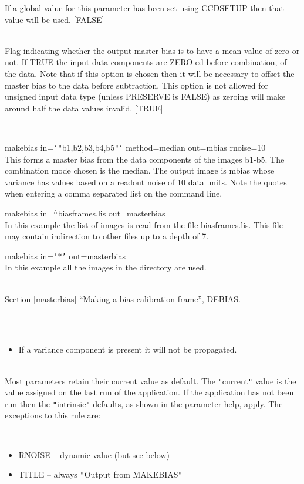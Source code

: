 \documentclass[twoside,11pt]{article}
\newcommand{\htmlref}[2]{#1}
\newcommand{\latexhtml}[2]{#1}
\renewcommand{\_}{\texttt{\symbol{95}}}
\newcommand{\qt}[1]{{\tt "}#1{\tt "}}
\newcommand{\qs}[1]{{\tt '}#1{\tt '}}
\newcommand{\xroutine}[1]{\htmlref{{\sc #1}}{#1}}
\newcommand{\secref}[2]{\latexhtml{Section \ref{#1} ``#2''}{``\htmlref{#2}{#1}''}}
\newcommand{\sstexamples}[1]{
   \item[Examples:] \mbox{} \\
   \vspace{-3.5ex}
   \begin{description}
      #1
   \end{description}
}
\newcommand{\sstsubsection}[1]{ \item[{#1}] \mbox{} \\}
\newcommand{\sstexamplesubsection}[2]{\sloppy \item{\ssttt #1} \mbox{} \\ #2 }
\newcommand{\sstnotes}[1]{\item[Notes:] \mbox{} \\[1.3ex] #1}
\newcommand{\sstdiytopic}[2]{\item[#1:] \mbox{} \\[1.3ex] #2}
\newcommand{\sstitemlist}[1]{
  \mbox{} \\
  \vspace{-3.5ex}
  \begin{itemize}
     #1
  \end{itemize}
}
\newcommand{\sstitem}{\item}
\newcommand{\sstexamples}[1]{
      \item[Examples:] \\
      \begin{description}
         #1
      \end{description}
      \\
   }
\newcommand{\sstsubsection}[1]{\item[{#1}]}
\newcommand{\sstexamplesubsection}[2]{\item[{\ssttt #1}] #2}
\newcommand{\sstnotes}[1]{\item[Notes:] #1 }
\newcommand{\sstdiytopic}[2]{\item[{#1:}] #2 }
\newcommand{\sstitemlist}[1]{
      \begin{itemize}
         #1
      \end{itemize}
      \\
   }
\newcommand{\sstitem}{\item}
\begin{document}
{{{         If a global value for this parameter has been set using 
         CCDSETUP then that value will be used. 
         [FALSE]
      }
      \sstsubsection{
         ZERO = \_LOGICAL (Read)
      } {
         Flag indicating whether the output master bias is to have a
         mean value of zero or not. If TRUE the input data components
         are ZERO-ed before combination, of the data. Note that if
         this option is chosen then it will be necessary to offset the
         master bias to the data before subtraction. This option is
         not allowed for unsigned input data type (unless PRESERVE is
         FALSE) as zeroing will make around half the data values
         invalid.
         [TRUE]
      }
   }
   \sstexamples{
      \sstexamplesubsection{
         makebias in=\qs{\qt{b1,b2,b3,b4,b5}} method=median out=mbias rnoise=10
      } {
         This forms a master bias from the data components of the images
         b1-b5. The combination mode chosen is the median. The output
         image is mbias whose variance has values based on a readout
         noise of 10 data units. Note the quotes when entering a comma
         separated list on the command line.
      }
      \sstexamplesubsection{
         makebias in=$^\wedge$bias\_frames.lis out=master\_bias
      } {
         In this example the list of images is read from the file
         bias\_frames.lis. This file may contain indirection to other files
         up to a depth of 7.
      }
      \sstexamplesubsection{
         makebias in=\qs{$*$} out=master\_bias
      } {
         In this example all the images in the directory are used.
      }
   }
   \sstdiytopic{
      See also
   } {
      \secref{masterbias}{Making a bias calibration frame},
      \xroutine{DEBIAS}.
   }
   \sstnotes{
      \sstitemlist{

         \sstitem
         If a variance component is present it will not be propagated.
      }
   }
   \sstdiytopic{
      Behaviour of parameters
   } {
      Most parameters retain their current value as default. The
      \qt{current} value is the value assigned on the last run of the
      application. If the application has not been run then the
      \qt{intrinsic} defaults, as shown in the parameter help, apply.
      The exceptions to this rule are:
      \sstitemlist{

         \sstitem
            RNOISE  -- dynamic value (but see below)

         \sstitem
            TITLE   -- always \qt{Output from MAKEBIAS}

}}}
\end{document}
